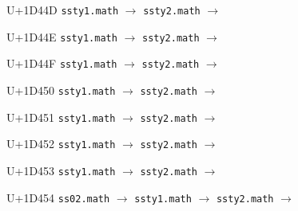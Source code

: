 \documentclass{article}
\begin{document}
\begin{substitutions}
\goodbreak

U+1D44D  \linebreak
    \texttt{ssty1.math} $\to$  \linebreak
    \texttt{ssty2.math} $\to$  

\goodbreak

U+1D44E  \linebreak
    \texttt{ssty1.math} $\to$  \linebreak
    \texttt{ssty2.math} $\to$  

\goodbreak

U+1D44F  \linebreak
    \texttt{ssty1.math} $\to$  \linebreak
    \texttt{ssty2.math} $\to$  

\goodbreak

U+1D450  \linebreak
    \texttt{ssty1.math} $\to$  \linebreak
    \texttt{ssty2.math} $\to$  

\goodbreak

U+1D451  \linebreak
    \texttt{ssty1.math} $\to$  \linebreak
    \texttt{ssty2.math} $\to$  

\goodbreak

U+1D452  \linebreak
    \texttt{ssty1.math} $\to$  \linebreak
    \texttt{ssty2.math} $\to$  

\goodbreak

U+1D453  \linebreak
    \texttt{ssty1.math} $\to$  \linebreak
    \texttt{ssty2.math} $\to$  

\goodbreak

U+1D454  \linebreak
    \texttt{ss02.math} $\to$  \linebreak
    \texttt{ssty1.math} $\to$  \linebreak
    \texttt{ssty2.math} $\to$  

\goodbreak


\end{substitutions}
\end{document}
